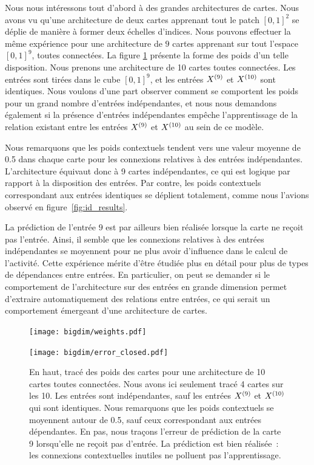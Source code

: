 \documentclass[../main]{subfiles}
\begin{document}
Nous nous intéressons tout d'abord à des grandes architectures de cartes. Nous avons vu qu'une architecture de deux cartes apprenant tout le patch $[0,1]^2$ se déplie de manière à former deux échelles d'indices. 
Nous pouvons effectuer la même expérience pour une architecture de $9$ cartes apprenant sur tout l'espace $[0,1]^9$, toutes connectées.
La figure \ref{fig:bigdim} présente la forme des poids d'un telle disposition. Nous prenons une architecture de 10 cartes toutes connectées. 
Les entrées sont tirées dans le cube $[0,1]^9$, et les entrées $X^{({9})}$ et $X^{({10})}$ sont identiques. Nous voulons d'une part observer comment se comportent les poids pour un grand nombre d'entrées indépendantes, et nous nous demandons également si la présence d'entrées indépendantes empêche l'apprentissage de la relation existant entre les entrées $X^{({9})}$ et $X^{({10})}$ au sein de ce modèle.

Nous remarquons que les poids contextuels tendent vers une valeur moyenne de 0.5 dans chaque carte pour les connexions relatives à des entrées indépendantes.
L'architecture équivaut donc à 9 cartes indépendantes, ce qui est logique par rapport à la disposition des entrées. Par contre, les poids contextuels correspondant aux entrées identiques se déplient totalement, comme nous l'avions observé en figure~\ref{fig:id_results}.

La prédiction de l'entrée $9$ est par ailleurs bien réalisée lorsque la carte ne reçoit pas l'entrée. Ainsi, il semble que les connexions relatives à des entrées indépendantes se moyennent pour ne plus avoir d'influence dans le calcul de l'activité.
Cette expérience mérite d'être étudiée plus en détail pour plus de types de dépendances entre entrées. 
En particulier, on peut se demander si le comportement de l'architecture sur des entrées en grande dimension permet d'extraire automatiquement des relations entre entrées, ce qui serait un comportement émergeant d'une architecture de cartes.

\begin{figure}[h!]
	\begin{minipage}{\textwidth}
	\texttt{[image: bigdim/weights.pdf]}
	\end{minipage}
\begin{minipage}{\textwidth}
	\centering\texttt{[image: bigdim/error\_closed.pdf]}
	\caption{En haut, tracé des poids des cartes pour une architecture de 10 cartes toutes connectées. Nous avons ici seulement tracé 4 cartes sur les 10. Les entrées sont indépendantes, sauf les entrées $X^{({9})}$ et $X^{({10})}$ qui sont identiques. Nous remarquons que les poids contextuels se moyennent autour de 0.5, sauf ceux correspondant aux entrées dépendantes. En pas, nous traçons l'erreur de prédiction de la carte 9 lorsqu'elle ne reçoit pas d'entrée. La prédiction est bien réalisée~: les connexions contextuelles inutiles ne polluent pas l'apprentissage. \label{fig:bigdim}}
\end{minipage}
\end{figure}
\end{document}
